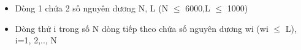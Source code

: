 \begin{itemize}
	\item     Dòng 1 chứa 2 số nguyên dương N, L (N $\le$ 6000,L $\le$ 1000)   
	\item     Dòng thứ i trong số N dòng tiếp theo chứa số nguyên dương wi (wi $\le$ L), i=1, 2,.., N   
\end{itemize}